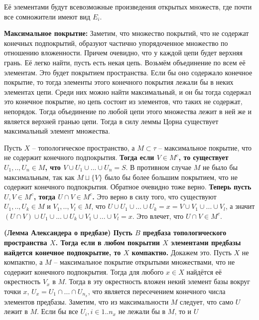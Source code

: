 \documentclass{article}
\begin{document}
\begin{enumerate}
        Её элементами будут всевозможные произведения открытых множеств, где
        почти все сомножители имеют вид $E_i$.\par
        \textbf{Максимальное покрытие:} Заметим, что множество покрытий, что не
        содержат конечных подпокрытий, образуют частично упорядоченное множество
        по отношению вложенности. Причем очевидно, что у каждой цепи будет
        верхняя грань. Её легко найти, пусть есть некая цепь. Возьмём
        объединение по всем её элементам. Это будет покрытием пространства.
        Если бы оно содержало конечное покрытие, то тогда элементы этого
        конечного покрытия лежали бы в неких элементах цепи. Среди них
        можно найти максимальный, и он бы тогда содержал это конечное покрытие,
        но цепь состоит из элементов, что таких не содержат, непорядок. Тогда
        объединение по любой цепи этого множества лежит в ней же и является
        верхней гранью цепи. Тогда в силу леммы Цорна существует максимальный
        элемент множества.\par
        Пусть $X$ – топологическое пространство, а $M\subset \tau$ –
        максимальное покрытие, что не содержит конечного подпокрытия.\textbf{
        Тогда если $V\in M^c$, то существует $U_1, .., U_n\in M$, что $V\cup
        U_1 \cup ...\cup U_n = S$}. В противном случае $M$ не было бы
        максимальным, так как $M\sqcup\{V\}$ было бы более большим покрытием,
        что не содержит конечного подпокрытия. Обратное очевидно тоже верно.
        \textbf{Теперь пусть $U, V\in M^c$, тогда $U\cap V\in M^c$.} Это верно
        в силу того, что существуют $U_1, .., U_k\in M$ и $V_1, .., V_l\in M$,
        что $U\cup U_1\cup ...\cup U_k=x=V\cup V_1\cup ...\cup V_l$, а значит
        $(U\cap V)\cup U_1\cup ...\cup U_k\cup V_1\cup ...\cup V_l=x$. Это
        влечет, что $U\cap V\in M^c$.\par
        \textbf{(Лемма Александера о предбазе) Пусть $B$ предбаза
        топологического пространства $X$. Тогда если в любом покрытии $X$
        элементами предбазы найдется конечное подпокрытие, то $X$ компактно.}
        Докажем это. Пусть $X$ не компактно, а $M$ – максимальное покрытие
        открытыми множествами, что не содержит конечного подпокрытия. Тогда для
        любого $x\in X$ найдётся её окрестность $V_x$ в $M$. Тогда в эту
        окрестность вложен некий элемент базы вокруг точки $x$, $U_x=U_1\cap...
        \cap U_{n_x}$, что является пересечением конечного числа элементов
        предбазы. Заметим, что из максимальности $M$ следует, что само $U$
        лежит в $M$. Если бы все $U_i,i\in1..n_x$ не лежали бы в $M$, то и $U$

\end{enumerate}
\end{document}
